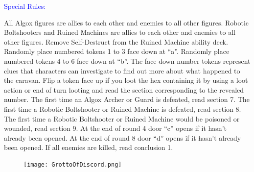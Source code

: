 \documentclass[fontsize=11pt]{scrartcl}
\begin{document}
\begin{multicols}{3}
    \begin{center}
	    {\myfont\LARGE{\textcolor{Blue}{Special Rules:}}}
		\end{center}
	  \footnotesize{All Algox figures are allies to each other and enemies to all other figures. Robotic Boltshooters and Ruined Machines are allies to each other and enemies to all other figures. Remove Self-Destruct from the Ruined Machine ability deck. Randomly place numbered tokens 1 to 3 face down at “a”. Randomly place numbered tokens 4 to 6 face down at “b”. The face down number tokens represent clues that characters can investigate to find out more about what happened to the caravan. Flip a token face up if you loot the hex containing it by using a loot action or end of turn looting and read the section corresponding to the revealed number.\newline\newline
The first time an Algox Archer or Guard is defeated, read section 7. The first time a Robotic Boltshooter or Ruined Machine is defeated, read section 8. The first time a Robotic Boltshooter or Ruined Machine would be poisoned or wounded, read section 9. At the end of round 4 door “c” opens if it hasn’t already been opened. At the end of round 8 door “d” opens if it hasn’t already been opened. If all enemies are killed, read conclusion 1.}
  \end{multicols}
	\begin{figure}[b]
    \centering
		\vspace*{-6cm}
    \texttt{[image: GrottoOfDiscord.png]}
  \end{figure}
	\newpage
\end{document}
